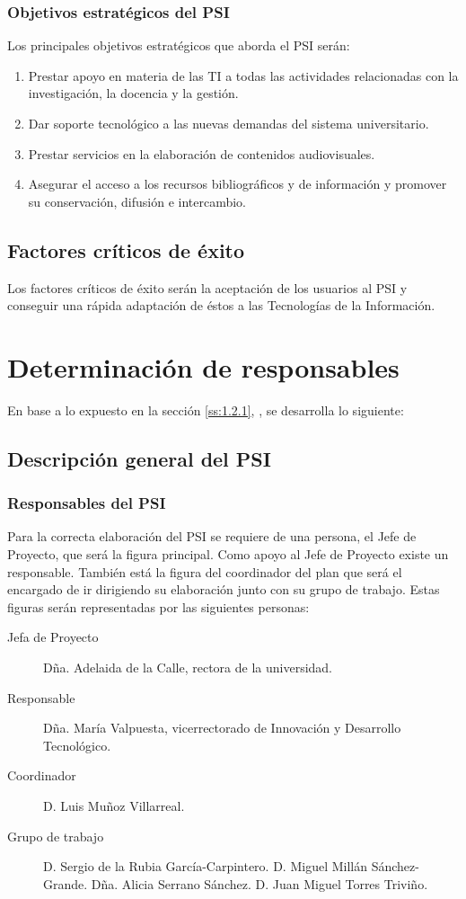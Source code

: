 \documentclass[11pt,a4paper,spanish,twoside]{report}
\begin{document}
\subsubsection{Objetivos estratégicos del PSI}
Los principales objetivos estratégicos que aborda el PSI serán:
\begin{enumerate}
\item Prestar apoyo en materia de las TI a todas las actividades relacionadas
con la investigación, la docencia y la gestión.
\item Dar soporte tecnológico a las nuevas demandas del sistema universitario.
\item Prestar servicios en la elaboración de contenidos audiovisuales.
\item Asegurar el acceso a los recursos bibliográficos y de información y 
promover su conservación, difusión e intercambio.
\end{enumerate}

\subsection{Factores críticos de éxito}
Los factores críticos de éxito serán la aceptación de
los usuarios al PSI y conseguir una rápida adaptación de éstos a las
Tecnologías de la Información.

\section{Determinación de responsables}
En base a lo expuesto en la sección \vref{ss:1.2.1}, \emph{},
se desarrolla lo siguiente:

\subsection{Descripción general del PSI}\label{ss:1.3.1}
\subsubsection{Responsables del PSI}
Para la correcta elaboración del PSI se requiere de una persona, el Jefe de 
Proyecto, que será la figura principal. Como apoyo al Jefe de Proyecto 
existe un responsable. También está la figura del coordinador del plan 
que será el encargado de ir dirigiendo su elaboración junto con su grupo de 
trabajo. Estas figuras serán representadas por las siguientes personas:
\begin{description}
\item[Jefa de Proyecto]
Dña. Adelaida de la Calle, rectora de la universidad.
\item[Responsable]
Dña. María Valpuesta, vicerrectorado de Innovación y Desarrollo Tecnológico.
\item[Coordinador]
D. Luis Muñoz Villarreal.
\item[Grupo de trabajo]
D. Sergio de la Rubia García-Carpintero.
D. Miguel Millán Sánchez-Grande.
Dña. Alicia Serrano Sánchez.
D. Juan Miguel Torres Triviño.
\end{description}
\end{document}
